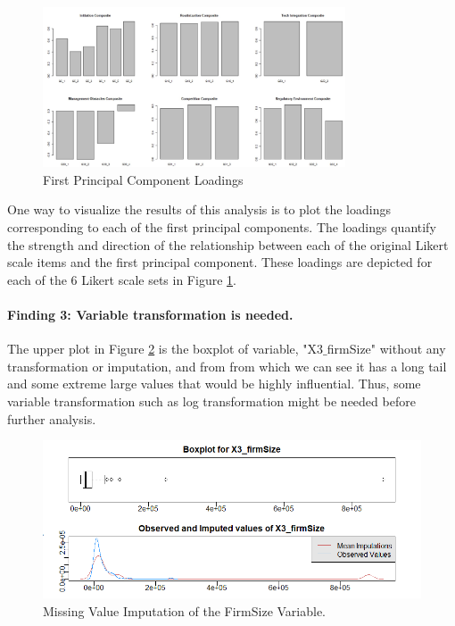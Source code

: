 \documentclass[12pt, letterpaper]{article}
\begin{document}
\begin{figure}[H]
\centering
\includegraphics[width=0.8\textwidth]{loadings.jpg}
\caption{First Principal Component Loadings}
\label{fig:loadings}
\end{figure}

\noindent One way to visualize the results of this analysis is to plot the loadings corresponding to each of the first principal components. The loadings quantify the strength and direction of the relationship between each of the original Likert scale items and the first principal component. These loadings are depicted for each of the 6 Likert scale sets in Figure \ref{fig:loadings}.


\paragraph{Finding 3: Variable transformation is needed.}
The upper plot in Figure \ref{fig:X3} is the boxplot of variable, "X3$\_$firmSize" without any transformation or imputation, and from from which we can see it has a long tail and some extreme large values that would be highly influential. Thus, some variable transformation such as log transformation might be needed before  further analysis. 

\begin{figure}[H]
\centering
\includegraphics[width=\textwidth]{X3.png}
\caption{Missing Value Imputation of the FirmSize Variable.}
\label{fig:X3}
\end{figure}
\end{document}
